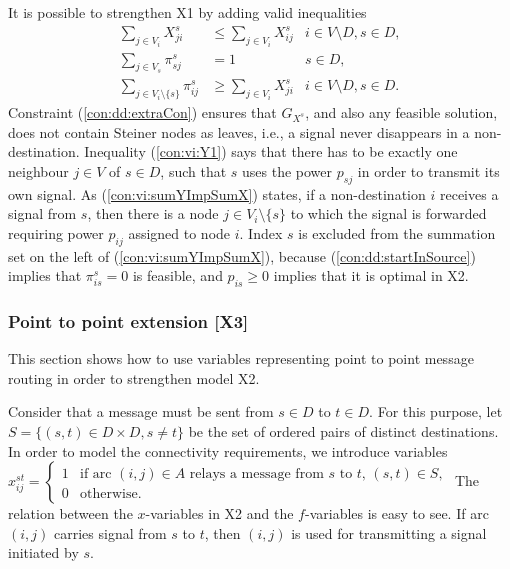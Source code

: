It is possible to strengthen X1 by adding valid inequalities
\begin{subequations}[resume]
\begin{align}
\label{con:dd:extraCon} \sum\limits_{j\in V_{i}}X^s_{ji} & \leq \sum\limits_{j\in V_{i}}X^s_{ij}  & 	i\in V\setminus D, s\in D,\\
\label{con:vi:Y1} \sum\limits_{j\in V_s}  \pi^{s}_{sj} & =1 & s\in D,\\
\label{con:vi:sumYImpSumX} \sum\limits_{j\in V_i\setminus\{s\} }\pi^{s}_{ij} & \geq \sum\limits_{j\in V_i}  X^{s}_{ji} & i\in V\setminus D, s\in D.
\end{align}
\end{subequations}
Constraint (\ref{con:dd:extraCon}) ensures that $G_{X^s}$, and also any feasible solution, does not contain Steiner nodes as leaves, i.e., a signal never disappears in a non-destination.
Inequality (\ref{con:vi:Y1}) says that there has to be exactly one neighbour $j\in V$ of $s\in D$, such that $s$ uses the power $p_{sj}$ in order to transmit its own signal.
As (\ref{con:vi:sumYImpSumX}) states, if a non-destination $i$ receives a signal from $s$, then there is a node $j\in V_i\setminus\{s\}$ to which the signal is forwarded requiring power $p_{ij}$ assigned to node $i$.
Index $s$ is excluded from the summation set on the left of (\ref{con:vi:sumYImpSumX}), because (\ref{con:dd:startInSource}) implies that $\pi_{is}^s=0$ is feasible, and $p_{is}\geq 0$ implies that it is optimal in X2. 

\subsubsection{Point to point extension [X3]}
\label{sec:smtx2}

This section shows how to use variables representing point to point message routing in order to strengthen model X2.

Consider that a message must be sent from $s\in D$ to $t\in D$.
For this purpose, let $S=\{(s,t)\in D\times D, s\neq t\}$ be the set of ordered pairs of distinct destinations.
In order to model the connectivity requirements, we introduce variables
\newline\newline
$x_{ij}^{st}=
\begin{cases}
    1 & \text{if arc $(i,j) \in A$ relays a message from $s$ to $t$, $(s,t)\in S$},\\
    0 & \text{otherwise}.
\end{cases}$
\newline\newline
%
The relation between the $x$-variables in X2 and the $f$-variables is easy to see.
If arc $(i,j)$ carries signal from $s$ to $t$, then $(i,j)$ is used for transmitting a signal initiated by $s$.

